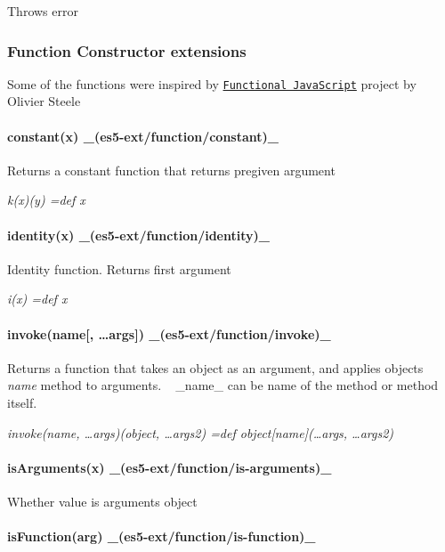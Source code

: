 Throws error

\subsubsection*{Function Constructor extensions}

Some of the functions were inspired by \href{http://osteele.com/sources/javascript/functional/}{\tt Functional Java\+Script} project by Olivier Steele

\paragraph*{constant(x) \+\_\+(es5-\/ext/function/constant)\+\_\+}

Returns a constant function that returns pregiven argument

{\itshape k(x)(y) =def x}

\paragraph*{identity(x) \+\_\+(es5-\/ext/function/identity)\+\_\+}

Identity function. Returns first argument

{\itshape i(x) =def x}

\paragraph*{invoke(name\mbox{[}, …args\mbox{]}) \+\_\+(es5-\/ext/function/invoke)\+\_\+}

Returns a function that takes an object as an argument, and applies object\textquotesingle{}s {\itshape name} method to arguments. ~\newline
\+\_\+name\+\_\+ can be name of the method or method itself.

{\itshape invoke(name, …args)(object, …args2) =def object\mbox{[}name\mbox{]}(…args, …args2)}

\paragraph*{is\+Arguments(x) \+\_\+(es5-\/ext/function/is-\/arguments)\+\_\+}

Whether value is arguments object

\paragraph*{is\+Function(arg) \+\_\+(es5-\/ext/function/is-\/function)\+\_\+}

